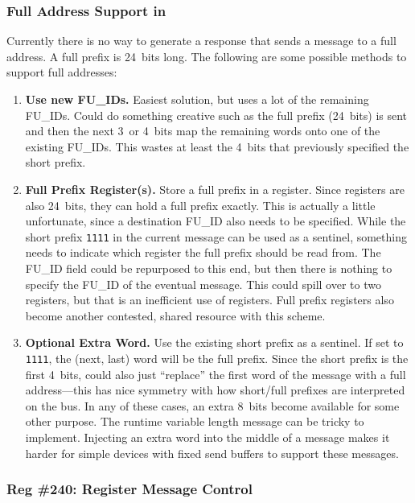 \subsubsection{Full Address Support in \proto}
\label{sec:todo-full-addr}
Currently there is no way to generate a response that sends a message to a
full address. A full prefix is 24~bits long. The following are some possible
methods to support full addresses:
\begin{enumerate}
  \item {\bf Use new FU\_IDs.} Easiest solution, but uses a lot of the
    remaining FU\_IDs. Could do something creative such as the full prefix
    (24~bits) is sent and then the next 3~or 4~bits map the remaining words
    onto one of the existing FU\_IDs. This wastes at least the 4~bits that
    previously specified the short prefix.
  \item {\bf Full Prefix Register(s).} Store a full prefix in a register.
    Since registers are also 24~bits, they can hold a full prefix exactly.
    This is actually a little unfortunate, since a destination FU\_ID also
    needs to be specified. While the short prefix {\tt 1111} in the current
    message can be used as a sentinel, something needs to indicate which
    register the full prefix should be read from. The FU\_ID field could be
    repurposed to this end, but then there is nothing to specify the FU\_ID of
    the eventual message. This could spill over to two registers, but that is
    an inefficient use of registers. Full prefix registers also become another
    contested, shared resource with this scheme.
  \item {\bf Optional Extra Word.} Use the existing short prefix as a
    sentinel. If set to {\tt 1111}, the (next, last) word will be the full
    prefix. Since the short prefix is the first 4~bits, could also just
    ``replace'' the first word of the message with a full address---this has
    nice symmetry with how short/full prefixes are interpreted on the bus. In
    any of these cases, an extra 8~bits become available for some other
    purpose. The runtime variable length message can be tricky to implement.
    Injecting an extra word into the middle of a message makes it harder for
    simple devices with fixed send buffers to support these messages.
\end{enumerate}

\subsubsection{Reg \#240: Register Message Control}
\label{cmd:conf-reg-ctrl}

